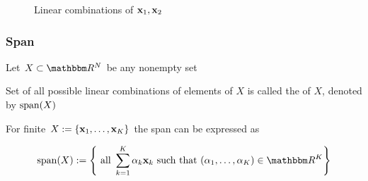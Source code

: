 \begin{frame}
    

    \begin{figure}
       \begin{center}
        \caption{\label{f:lin_comb} Linear combinations of ${\mathbf x}_1, {\mathbf x}_2$}
       \end{center}
    \end{figure}

\end{frame}

\begin{frame}

    \frametitle{Span}

    \vspace{2em}
    Let $X \subset \RR^N$ be any nonempty set

    \vspace{1em}

    Set of all possible linear combinations of elements of $X$ is 
    called the  of $X$, denoted by $\operatorname{span}(X)$

    \vspace{.7em}

    For finite $X := \{{\mathbf x}_1,\ldots, {\mathbf x}_K\}$ the span can be expressed
    as 
    
    \begin{equation*}
        \Span(X):= \left\{ \text{ all } \sum_{k=1}^K \alpha_k \boldx_k 
        \text{ such that }
         (\alpha_1,\ldots, \alpha_K) \in \RR^K \right\}
    \end{equation*}
    
\end{frame}

